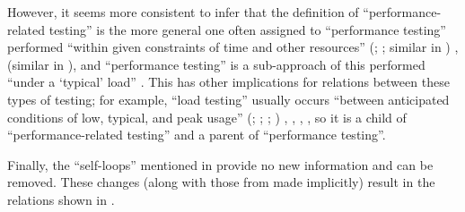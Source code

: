 However, it seems more consistent to infer
that the definition of ``performance-related testing'' is the more general one
often assigned to ``performance testing'' performed ``within given constraints
of time and other resources'' \ifnotpaper (\citealp[p.~7]{IEEE2022};
      \citeyear[p.~320]{IEEE2017}; similar in \citealp[p.~1187]{Moghadam2019})%
\else \cite[p.~320]{IEEE2017}, \cite[p.~7]{IEEE2022}
      (similar in \cite[p.~1187]{Moghadam2019})\fi, and
``performance testing'' is a sub-approach of this performed ``under a `typical'
load'' \citep[p.~39]{IEEE2021}. This has other implications for relations
between these types of testing; for example, ``load testing'' usually occurs
``between anticipated conditions of low, typical, and peak usage''
\ifnotpaper (\citealp[p.~5]{IEEE2022}; \citeyear[p.~39]{IEEE2021};
      \citeyear[p.~253]{IEEE2017}; \citealpISTQB{})%
\else \cite[p.~253]{IEEE2017}, \cite{ISTQB}, \cite[p.~5]{IEEE2022},
      \cite[p.~39]{IEEE2021}\fi, so it is a child of ``performance-related
testing'' and a parent of ``performance testing''.

Finally, the ``self-loops'' mentioned in  provide no new
information and can be removed. These changes (along with those from
 made implicitly) result in
the relations shown in .
